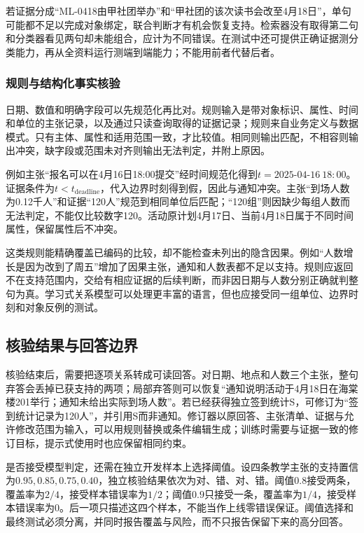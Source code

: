 若证据分成“ML-0418由甲社团举办”和“甲社团的该次读书会改至4月18日”，单句可能都不足以完成对象绑定，联合判断才有机会恢复支持。检索器没有取得第二句和分类器看见两句却未能组合，应计为不同错误。在测试中还可提供正确证据测分类能力，再从全资料运行测端到端能力；不能用前者代替后者。

\subsubsection{规则与结构化事实核验}
\label{sec:nlp-dialogue-structured-check}

日期、数值和明确字段可以先规范化再比对。规则输入是带对象标识、属性、时间和单位的主张记录，以及通过只读查询取得的证据记录；规则来自业务定义与数据模式。只有主体、属性和适用范围一致，才比较值。相同则输出匹配，不相容则输出冲突，缺字段或范围未对齐则输出无法判定，并附上原因。

例如主张“报名可以在4月16日18:00提交”经时间规范化得到$t=2025\text{-}04\text{-}16\ 18{:}00$。证据条件为$t<t_{\mathrm{deadline}}$，代入边界时刻得到假，因此与通知冲突。主张“到场人数为0.12千人”和证据“120人”规范到相同单位后匹配；“120组”则因缺少每组人数而无法判定，不能仅比较数字120。活动原计划4月17日、当前4月18日属于不同时间属性，保留属性后不冲突。

这类规则能精确覆盖已编码的比较，却不能检查未列出的隐含因果。例如“人数增长是因为改到了周五”增加了因果主张，通知和人数表都不足以支持。规则应返回不在支持范围内，交给有相应证据的后续判断，而非因日期与人数分别正确就判整句为真。学习式关系模型可以处理更丰富的语言，但也应接受同一组单位、边界时刻和对象反例的测试。

\subsection{核验结果与回答边界}
\label{sec:nlp-dialogue-answer-boundary}

核验结束后，需要把逐项关系转成可读回答。对日期、地点和人数三个主张，整句弃答会丢掉已获支持的两项；局部弃答则可以恢复“通知说明活动于4月18日在海棠楼201举行；通知未给出实际到场人数”。若已经获得独立签到统计S，可修订为“签到统计记录为120人”，并引用S而非通知。修订器以原回答、主张清单、证据与允许修改范围为输入，可以用规则替换或条件编辑生成；训练时需要与证据一致的修订目标，提示式使用时也应保留相同约束。

是否接受模型判定，还需在独立开发样本上选择阈值。设四条教学主张的支持置信为$0.95,0.85,0.75,0.40$，独立核验结果依次为对、错、对、错。阈值$0.8$接受两条，覆盖率为$2/4$，接受样本错误率为$1/2$；阈值$0.9$只接受一条，覆盖率为$1/4$，接受样本错误率为0。后一项只描述这四个样本，不能当作上线零错误保证。阈值选择和最终测试必须分离，并同时报告覆盖与风险，而不只报告保留下来的高分回答。

